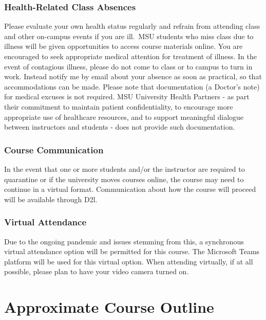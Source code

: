 \documentclass[11pt,]{article}
\begin{document}
\hypertarget{health-related-class-absences}{%
\subsubsection{Health-Related Class
Absences}\label{health-related-class-absences}}

Please evaluate your own health status regularly and refrain from
attending class and other on-campus events if you are ill.~MSU students
who miss class due to illness will be given opportunities to access
course materials online. You are encouraged to seek appropriate medical
attention for treatment of illness. In the event of contagious illness,
please do not come to class or to campus to turn in work. Instead notify
me by email about your absence as soon as practical, so that
accommodations can be made. Please note that documentation (a Doctor's
note) for medical excuses is not required. MSU University Health
Partners - as part their commitment to maintain patient confidentiality,
to encourage more appropriate use of healthcare resources, and to
support meaningful dialogue between instructors and students - does not
provide such documentation.

\hypertarget{course-communication}{%
\subsubsection{Course Communication}\label{course-communication}}

In the event that one or more students and/or the instructor are
required to quarantine or if the university moves courses online, the
course may need to continue in a virtual format. Communication about how
the course will proceed will be available through D2l.

\hypertarget{virtual-attendance}{%
\subsubsection{Virtual Attendance}\label{virtual-attendance}}

Due to the ongoing pandemic and issues stemming from this, a synchronous
virtual attendance option will be permitted for this course. The
Microsoft Teams platform will be used for this virtual option. When
attending virtually, if at all possible, please plan to have your video
camera turned on.

\hypertarget{approximate-course-outline}{%
\section{Approximate Course Outline}\label{approximate-course-outline}}
\end{document}
